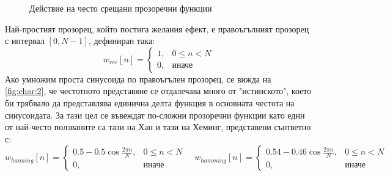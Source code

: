 \documentclass[main.tex]{subfiles}
\begin{document}
    \begin{figure}[H]%
        \centering
            \hspace{2cm}
            \vfill
            \hspace{2cm}
            \vfill
            \hspace{2cm}
        \caption{Действие на често срещани прозоречни функции}%
        \label{fig:char:2}
    \end{figure}

    Най-простият прозорец, който постига желания ефект, е правоъгълният прозорец с интервал $[0, N-1]$, дефиниран така: 
   \[
    w_{rec}[n] = \begin{cases} 
        1, & 0\leq n < N \\
        0, & \text{иначе}
    \end{cases}
    \]
    Ако умножим проста синусоида по правоъгълен прозорец, се вижда на \autoref{fig:char:2}, че честотното представяне се отдалечава много от "истинското", което би трябвало да представлява единична делта функция в основната честота на синусоидата. За тази цел се въвеждат по-сложни прозоречни функции като едни от най-често ползваните са тази на Хан и тази на Хеминг, представени съответно с:
    \[
    w_{hanning}[n] = \begin{cases} 
        0.5 - 0.5 \cos{\frac{2\pi n}{N}}, & 0\leq n < N \\
        0, & \text{иначе}
    \end{cases}\quad w_{hamming}[n] = \begin{cases} 
        0.54 - 0.46 \cos{\frac{2\pi n}{N}}, & 0\leq n < N \\
        0, & \text{иначе}
    \end{cases}
    \]
\end{document}
